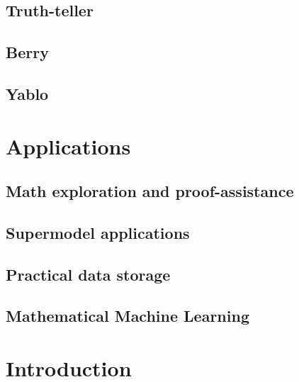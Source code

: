 \documentclass[12pt]{article}
\begin{document}
\subsection{Truth-teller} 
\subsection{Berry}
\subsection{Yablo}
\section{Applications} 
\subsection{Math exploration and proof-assistance}
\subsection{Supermodel applications}
\subsection{Practical data storage} 
\subsection{Mathematical Machine Learning} 

\section{Introduction}
\end{document}

